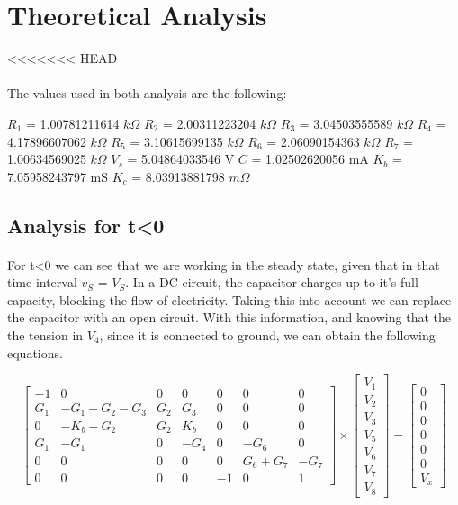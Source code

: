 \section{Theoretical Analysis}
\label{sec:analysis}

<<<<<<< HEAD
\paragraph{} The values used in both analysis are the following:

$R_1$ = 1.00781211614 $k\Omega$
$R_2$ = 2.00311223204 $k\Omega$
$R_3$ = 3.04503555589 $k\Omega$
$R_4$ = 4.17896607062 $k\Omega$
$R_5$ = 3.10615699135 $k\Omega$
$R_6$ = 2.06090154363 $k\Omega$
$R_7$ = 1.00634569025 $k\Omega$
$V_s$ = 5.04864033546 V
$C$ = 1.02502620056 mA
$K_b$ = 7.05958243797 mS
$K_c$ = 8.03913881798 $m\Omega$

\subsection{Analysis for t<0}

\paragraph{} For t<0 we can see that we are working in the steady state, given that in that time interval $v_S$ = $V_S$. In a DC circuit, the capacitor charges up to it's full capacity, blocking the flow of electricity. Taking 
this into account we can replace the capacitor with an open circuit. With this information, and knowing that the the tension in $V_4$, since it is connected to ground, we can obtain the following equations.

\begin{equation}
\begin{bmatrix}
	-1	&	0	&	0	&	0	&	0	&	0	&	0 \\
	G_1	&	-G_1 - G_2 - G_3	&	G_2	&	G_3	&	0	&	0	&	0 \\
	0	&	-K_b - G_2	&	G_2	&	K_b	&	0	&	0	&	0 \\
	G_1	&	-G_1	&	0	&	-G_4	&	0	&	-G_6	&	0 \\
	0	&	0	&	0	&	0	&	0	&	G_6 + G_7	&	-G_7 \\
	0	&	0	&	0	&	0	&	-1	&	0	&	1
\end{bmatrix}
\times
\begin{bmatrix}
	V_1 \\
	V_2 \\
	V_3 \\
	V_5 \\
	V_6 \\
	V_7 \\
	V_8
\end{bmatrix}
=
\begin{bmatrix}
	0 \\
	0 \\
	0 \\
	0 \\
	0 \\
	0 \\
	V_x
	\label{m:1}
\end{bmatrix}
\end{equation}


